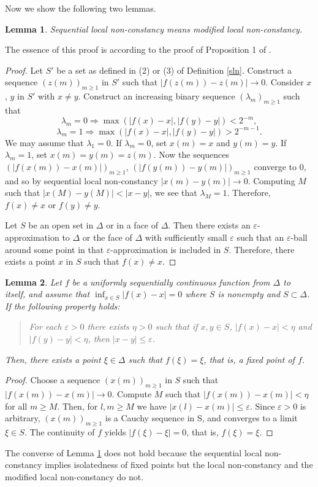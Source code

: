 \documentclass[reqno]{amsart}
\newtheorem{lem}{Lemma}
\begin{document}
Now we show the following two lemmas.
\begin{lem}
Sequential local non-constancy means modified local non-constancy.\label{seq}
\end{lem}
The essence of this proof is according to the proof of Proposition 1 of \cite{berg}.
\begin{proof}
Let $S'$ be a set as defined in (2) or (3) of Definition \ref{sln}. Construct a sequence $(z(m))_{m\geq 1}$ in $S'$ such that $|f(z(m))-z(m)|\longrightarrow 0$. Consider $x$, $y$ in $S'$ with $x\neq y$. Construct an increasing binary sequence $(\lambda_m)_{m\geq 1}$ such that
\[\lambda_m=0\Rightarrow \max(|f(x)-x|, |f(y)-y|)<2^{-m},\]
\[\lambda_m=1\Rightarrow \max(|f(x)-x|, |f(y)-y|)>2^{-m-1}.\]
We may assume that $\lambda_1=0$. If $\lambda_m=0$, set $x(m)=x$ and $y(m)=y$. If $\lambda_m=1$, set $x(m)=y(m)=z(m)$. Now the sequences $(|f(x(m))-x(m)|)_{m\geq 1}$, $(|f(y(m))-y(m)|)_{m\geq 1}$ converge to 0, and so by sequential local non-constancy $|x(m)-y(m)|\longrightarrow 0$. Computing $M$ such that $|x(M)-y(M)|<|x-y|$, we see that $\lambda_M=1$. Therefore, $f(x)\neq x$ or $f(y)\neq y$.

Let $S$ be an open set in $\Delta$ or in a face of $\Delta$. Then there exists an $\varepsilon$-approximation to $\Delta$ or the face of $\Delta$ with sufficiently small $\varepsilon$ such that an $\varepsilon$-ball around some point in that $\varepsilon$-approximation is included in $S$. Therefore, there exists a point $x$ in $S$ such that $f(x)\neq x$.
\end{proof}

\begin{lem}
Let $f$ be a uniformly sequentially continuous function from $\Delta$ to itself, and assume that $\inf_{x\in S}|f(x)-x|=0$ where $S$ is nonempty and $S\subset \Delta$. If the following property holds:
\begin{quote}
For each $\varepsilon>0$ there exists $\eta>0$ such that if $x, y\in S$, $|f(x)-x|<\eta$ and $|f(y)-y|<\eta$, then $|x-y|\leq \varepsilon$.
\end{quote}
Then, there exists a point $\xi\in \Delta$ such that $f(\xi)=\xi$, that is, a fixed point of $f$. \label{fix0}
\end{lem}
\begin{proof}
Choose a sequence $(x(m))_{m\geq 1}$ in $S$ such that $|f(x(m))-x(m)|\longrightarrow 0$. Compute $M$ such that $|f(x(m))-x(m)|<\eta$ for all $m\geq M$. Then, for $l, m\geq M$ we have $|x(l)-x(m)|\leq \varepsilon$. Since $\varepsilon>0$ is arbitrary, $(x(m))_{m\geq 1}$ is a Cauchy sequence in S, and converges to a limit $\xi\in S$. The continuity of $f$ yields $|f(\xi)-\xi|=0$, that is, $f(\xi)=\xi$.
\end{proof}
The converse of Lemma \ref{seq} does not hold because the sequential local non-constancy implies isolatedness of fixed points but the local non-constancy and the modified local non-constancy do not.
\end{document}
